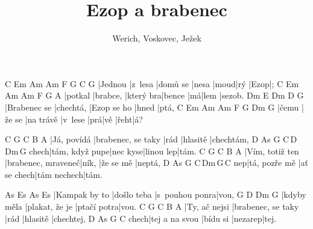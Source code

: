 \documentclass{song}
\title{Ezop a brabenec}
\author{Werich, Voskovec, Ježek}
\begin{document}
\strophe
C       Em      Am       Am\7  F    G\7 C    G\7
|Jednou |z~lesa |domů se |nesa |moud|rý |Ezop|;
C       Em       Am        Am\7   F  G\7  A
|potkal |brabce, |který bra|bence |má|lem |sezob.
Dm           E         Dm          D\7   G\7
|Brabenec se |chechtá, |Ezop se ho |hned |ptá,
C     Em     Am        Am\7    F   G   Dm   G\7
|čemu |že se |na trávě |v~lese |prá|vě |řeht|á?
\endstrophe

\strophe
C           G\7                C    B        A\7
|Já, povídá |brabenec, se taky |rád |hlasitě |chechtám,
     D\7            As\7     G\7       C\,D\7\,Dm\7\,G\7
chech|tám, když pupe|nec kyse|linou lep|tám.
C               G\7                C     B         A\7
|Vím, totiž ten |brabenec, mraveneč|ník, |že se mě |neptá,
   D\7           As\7        G\7         C\,Dm\,G\7\,C
nep|tá, pozře mě |ať se chech|tám nechech|tám.
\endstrophe

\strophe
As            Es\7        As             Es\7
|Kampak by to |došlo teba |s~pouhou ponra|vou,
G           D\7            Dm          G\7
|kdyby měla |plakat, že je |ptačí potra|vou.
C             G\7                C    B        A\7
|Ty, ač nejsi |brabenec, se taky |rád |hlasitě |chechtej,
     D\7           As\7      G\7     C
chech|tej a na svou |bídu si |nezarep|tej.
\endstrophe

\end{document}
